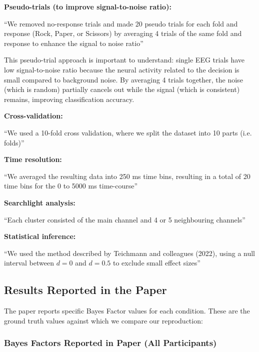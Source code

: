 \documentclass[11pt,a4paper]{article}
\begin{document}
\textbf{Pseudo-trials (to improve signal-to-noise ratio):}
\begin{paperquote}
``We removed no-response trials and made 20 pseudo trials for each fold and response (Rock, Paper, or Scissors) by averaging 4 trials of the same fold and response to enhance the signal to noise ratio''
\end{paperquote}

This pseudo-trial approach is important to understand: single EEG trials have low signal-to-noise ratio because the neural activity related to the decision is small compared to background noise. By averaging 4 trials together, the noise (which is random) partially cancels out while the signal (which is consistent) remains, improving classification accuracy.

\textbf{Cross-validation:}
\begin{paperquote}
``We used a 10-fold cross validation, where we split the dataset into 10 parts (i.e. folds)''
\end{paperquote}

\textbf{Time resolution:}
\begin{paperquote}
``We averaged the resulting data into 250 ms time bins, resulting in a total of 20 time bins for the 0 to 5000 ms time-course''
\end{paperquote}

\textbf{Searchlight analysis:}
\begin{paperquote}
``Each cluster consisted of the main channel and 4 or 5 neighbouring channels''
\end{paperquote}

\textbf{Statistical inference:}
\begin{paperquote}
``We used the method described by Teichmann and colleagues (2022), using a null interval between $d = 0$ and $d = 0.5$ to exclude small effect sizes''
\end{paperquote}

\subsection{Results Reported in the Paper}
\label{subsec:paper_results}

The paper reports specific Bayes Factor values for each condition. These are the ground truth values against which we compare our reproduction:

\subsubsection{Bayes Factors Reported in Paper (All Participants)}
\end{document}
